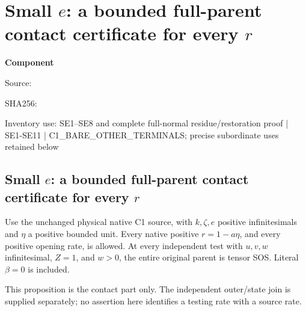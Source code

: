 \chapter{Small $e$: a bounded full-parent contact certificate for every $r$}
\label{component:pa7e744614f49}
\noindent\textbf{Component }\par
{\small\noindent Source: \par}
{\small\noindent SHA256: \par}
{\small\noindent Inventory use: SE1--SE8 and complete full-normal residue/restoration proof | SE1-SE11 | C1\_\allowbreak{}BARE\_\allowbreak{}OTHER\_\allowbreak{}TERMINALS; precise subordinate uses retained below\par}
\medskip
\section[Small e: a bounded full-parent contact certificate for every r]{Small $e$: a bounded full-parent contact certificate for every $r$}

\begin{proposition}
Use the unchanged physical native C1 source, with $k,\zeta,e$ positive
infinitesimals and $\eta$ a positive bounded unit. Every native positive
$r=1-a\eta$, and every positive opening rate, is allowed.
At every independent test with $u,v,w$ infinitesimal, $Z=1$, and $w>0$,
the entire original parent is tensor SOS. Literal $\beta=0$ is included.
\end{proposition}
This proposition is the contact part only. The independent outer/state
join is supplied separately; no assertion here identifies a testing rate
with a source rate.


